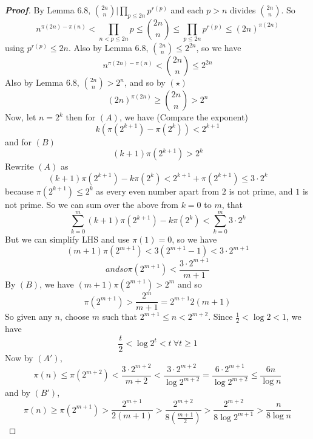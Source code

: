 \begin{proof}[\bf Proof] By Lemma 6.8, $\binom{2n}{n} \big| \prod_{p \le 2n}p^{r(p)}$ and each $p>n$ divides
$\binom{2n}{n}$. So
\begin{equation}
n^{\pi(2n)-\pi(n)}<\prod_{n<p \le 2n}p \le \binom{2n}{n} \le \prod_{p \le 2n}p^{r(p)}
\le (2n)^{\pi(2n)} \tag{$\star$}
\end{equation}
using $p^{r(p)} \le 2n$. Also by Lemma 6.8, $\binom{2n}{n} \le 2^{2n}$, so we have
\begin{equation}
n^{\pi(2n)-\pi(n)}<\binom{2n}{n} \le 2^{2n} \tag{A}
\end{equation}
Also by Lemma 6.8, $\binom{2n}{n} >2^n$, and so by $(\star)$
\begin{equation}
(2n)^{\pi(2n)} \ge \binom{2n}{n} > 2^n \tag{B}
\end{equation}
Now, let $n=2^k$ then for $(A)$, we have (Compare the exponent)
$$k\left(\pi(2^{k+1})-\pi(2^k)\right) <2^{k+1}$$
and for $(B)$
$$(k+1)\pi(2^{k+1}) > 2^k$$
Rewrite $(A)$ as
$$(k+1)\pi(2^{k+1})-k\pi(2^k) <2^{k+1} +\pi(2^{k+1}) \le 3 \cdot 2^k$$
because $\pi(2^{k+1}) \le 2^k$ as every even number apart from $2$ is not prime, and $1$ is not prime.
So we can sum over the above from $k=0$ to $m$, that
$$\sum_{k=0}^{m}(k+1)\pi(2^{k+1})-k\pi(2^k)<\sum_{k=0}^{m}3 \cdot 2^k$$
But we can simplify LHS and use $\pi(1)=0$, so we have
$$(m+1)\pi(2^{m+1}) < 3(2^{m+1}-1)<3 \cdot 2^{m+1} $$
\begin{equation}
and so
\pi(2^{m+1}) <\frac{3 \cdot 2^{m+1}}{m+1} \tag{$A'$}
\end{equation}
By $(B)$, we have $(m+1)\pi(2^{m+1}) > 2^m$ and so
\begin{equation}
\pi(2^{m+1}) >\frac{2^m}{m+1}=2^{m+1}{2(m+1)} \tag{$B'$}
\end{equation}
So given any $n$, choose $m$ such that $2^{m+1} \le n < 2^{m+2}$.
Since $\frac{1}{2} < \log{2} <1$, we have
$$\frac{t}{2} < \log{2^t} <t ~\forall t \ge 1$$
Now by $(A')$,
$$\pi(n) \le \pi(2^{m+2}) <\frac{3 \cdot 2^{m+2}}{m+2} <\frac{3 \cdot 2^{m+2}}{\log{2^{m+2}}}
=\frac{6 \cdot 2^{m+1}}{\log{2^{m+2}}} \le \frac{6n}{\log{n}}$$
and by $(B')$,
$$\pi(n) \ge \pi(2^{m+1}) > \frac{2^{m+1}}{2(m+1)} >\frac{2^{m+2}}{8\left(\frac{m+1}{2}\right)}
>\frac{2^{m+2}}{8\log{2^{m+1}}} > \frac{n}{8\log{n}}$$
\end{proof}
